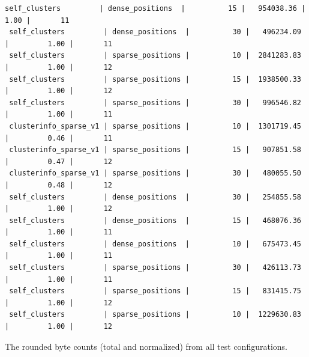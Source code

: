 \documentclass{thesis}
\begin{document}
\begin{table}
\begin{Verbatim}[fontsize=\scriptsize]
 self_clusters         | dense_positions  |          15 |   954038.36 |         1.00 |       11
 self_clusters         | dense_positions  |          30 |   496234.09 |         1.00 |       11
 self_clusters         | sparse_positions |          10 |  2841283.83 |         1.00 |       12
 self_clusters         | sparse_positions |          15 |  1938500.33 |         1.00 |       12
 self_clusters         | sparse_positions |          30 |   996546.82 |         1.00 |       11
 clusterinfo_sparse_v1 | sparse_positions |          10 |  1301719.45 |         0.46 |       11
 clusterinfo_sparse_v1 | sparse_positions |          15 |   907851.58 |         0.47 |       12
 clusterinfo_sparse_v1 | sparse_positions |          30 |   480055.50 |         0.48 |       12
 self_clusters         | dense_positions  |          30 |   254855.58 |         1.00 |       12
 self_clusters         | dense_positions  |          15 |   468076.36 |         1.00 |       11
 self_clusters         | dense_positions  |          10 |   675473.45 |         1.00 |       11
 self_clusters         | sparse_positions |          30 |   426113.73 |         1.00 |       11
 self_clusters         | sparse_positions |          15 |   831415.75 |         1.00 |       12
 self_clusters         | sparse_positions |          10 |  1229630.83 |         1.00 |       12
        \end{Verbatim}
        \label{table:normedruns}
        \caption{The rounded byte counts (total and normalized) from all test configurations.}
    \end{table}
\end{document}
